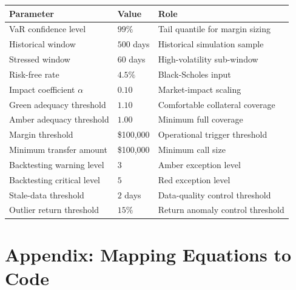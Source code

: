 \documentclass[11pt]{article}
\begin{document}
\begin{center}
\begin{tabular}{>{\raggedright\arraybackslash}p{} >{\raggedright\arraybackslash}p{} >{\raggedright\arraybackslash}p{}}
\toprule
Parameter & Value & Role \\
\midrule
VaR confidence level & \(99\%\) & Tail quantile for margin sizing \\
Historical window & \(500\) days & Historical simulation sample \\
Stressed window & \(60\) days & High-volatility sub-window \\
Risk-free rate & \(4.5\%\) & Black-Scholes input \\
Impact coefficient \(\alpha\) & \(0.10\) & Market-impact scaling \\
Green adequacy threshold & \(1.10\) & Comfortable collateral coverage \\
Amber adequacy threshold & \(1.00\) & Minimum full coverage \\
Margin threshold & \$100{,}000 & Operational trigger threshold \\
Minimum transfer amount & \$100{,}000 & Minimum call size \\
Backtesting warning level & \(3\) & Amber exception level \\
Backtesting critical level & \(5\) & Red exception level \\
Stale-data threshold & \(2\) days & Data-quality control threshold \\
Outlier return threshold & \(15\%\) & Return anomaly control threshold \\
\bottomrule
\end{tabular}
\end{center}

\section{Appendix: Mapping Equations to Code}
\end{document}
